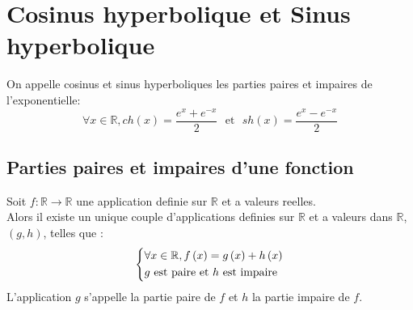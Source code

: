 \documentclass[12pt,twoside,a4paper]{article}
\author{MPSI 2}
\begin{document}
	\maketitle

	\section{Cosinus hyperbolique et Sinus hyperbolique}
		\begin{defi}
			On appelle cosinus et sinus hyperboliques les parties paires et impaires de l'exponentielle:
			$$\forall x\in\mathbb{R},ch\left(x\right)=\frac{e^x+e^{-x}}{2} \ \ \ \text{et} \ \ \ sh\left(x\right)=\frac{e^x-e^{-x}}{2}$$
		\end{defi}
		
		\subsection{Parties paires et impaires d'une fonction}
			\begin{prop}
				Soit $f\colon\mathbb{R}\longrightarrow\mathbb{R}$ une application definie sur $\mathbb{R}$ et a valeurs reelles. \\
				Alors il existe un unique couple d'applications definies sur $\mathbb{R}$ et a valeurs dans $\mathbb{R}$, $\left(g,h\right)$, telles que :\\
				$$\left\{\begin{aligned}&\forall x\in\mathbb{R},f\left(x\right)=g\left(x\right)+h\left(x\right) \\
						   &g\ \text{est paire et }h\ \text{est impaire}\end{aligned}\right.$$
				L'application $g$ s'appelle la partie paire de $f$ et $h$ la partie impaire de $f$.
			\end{prop}
\end{document}
